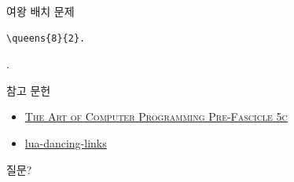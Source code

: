 \documentclass[xcolor=svgnames]{beamer}
\begin{document}
%
\begin{frame}[fragile]{여왕 배치 문제}
\begin{verbatim}
\queens{8}{2}.
\end{verbatim}
\vspace{-10mm}
.
\end{frame}

%
\begin{frame}{참고 문헌}
  \begin{itemize}
  \item \href{http://www-cs-faculty.stanford.edu/~knuth/fasc5c.ps.gz}
    {\textsc{The Art of Computer Programming Pre-Fascicle 5c}}
  \item \href{https://github.com/sjnam/lua-dancing-links}
    {lua-dancing-links}
  \end{itemize}
\end{frame}

%
\begin{frame}[standout]
  질문?
\end{frame}
\end{document}
